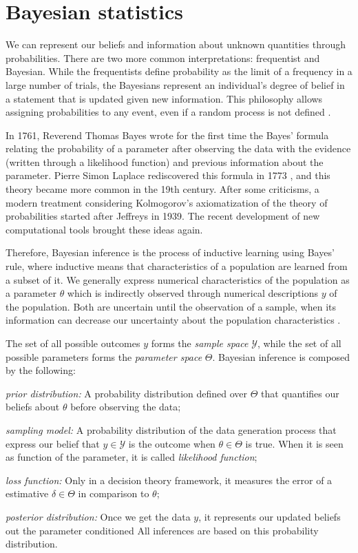 \section{Bayesian statistics}
\label{sec:bayesian_statistics}

We can represent our beliefs and information about unknown quantities 
through probabilities. There are two more common interpretations: 
frequentist and Bayesian. While the frequentists define
probability as the limit of a frequency in a large number of trials, the
Bayesians represent an individual's degree of belief in a statement that is
updated given new information. This philosophy allows assigning probabilities
to any event, even if a random process is not defined \cite{statisticat2016laplacesdemon}. 

In 1761, Reverend Thomas Bayes wrote for the first time the Bayes' formula
relating the probability of a parameter after observing the data with the
evidence (written through a likelihood function) and previous information
about the parameter. Pierre Simon Laplace rediscovered this formula in 1773
\cite{Robert2007}, and this theory became more common in the 19th century.
After some criticisms, a modern treatment considering Kolmogorov's
axiomatization of the theory of probabilities started after Jeffreys in 1939.
The recent development of new computational tools brought these ideas again.

Therefore, Bayesian inference is the process of inductive learning using
Bayes' rule, where inductive means that characteristics of a population are 
learned from a subset of it. We generally
express numerical characteristics of the population as a parameter $\theta$ which is
indirectly observed through numerical descriptions $y$ of the population. Both are
uncertain until the observation of a sample, when its information can decrease
our uncertainty about the population characteristics \cite[p. 1-2]{hoff2009first}.

The set of all possible outcomes $y$ forms the {\em sample space}
$\mathcal{Y}$, while the set of all possible parameters forms the {\em
parameter space} $\Theta$. Bayesian inference is composed by the following: 

\begin{alineas}
    \item {\em prior distribution:} A probability distribution defined over 
    $\Theta$ that quantifies our beliefs about $\theta$ before observing the data;
    \item {\em sampling model: } A probability distribution of the data generation process
    that express our belief that $y \in \mathcal{Y}$ is the outcome when
    $\theta \in \Theta$ is true. When it is seen as function of the parameter,
    it is called {\em likelihood function};
    \item {\em loss function:} Only in a decision theory framework, it
    measures the error of a estimative $\delta \in \Theta$ in comparison to
    $\theta$;
    \item {\em posterior distribution:} Once we get the data $y$, it
    represents our updated beliefs out the parameter conditioned All
    inferences are based on this probability distribution.
\end{alineas} 

